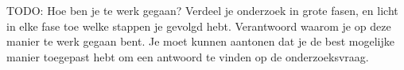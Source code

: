 
\chapter{}
\label{ch:methodologie}

TODO: Hoe ben je te werk gegaan? Verdeel je onderzoek in grote fasen, en licht in elke fase toe welke stappen je gevolgd hebt. Verantwoord waarom je op deze manier te werk gegaan bent. Je moet kunnen aantonen dat je de best mogelijke manier toegepast hebt om een antwoord te vinden op de onderzoeksvraag.



